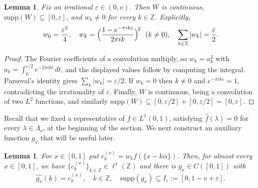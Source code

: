 \documentclass[reqno,a4paper,12pt]{amsart}
\numberwithin{equation}{section}
\newtheorem{lemma}[definition]{Lemma}
\def\Z{{\mathbb Z}}
\newcommand{\supp}{{\mathrm{supp}}}
\newcommand\1{\mathds{1}}
\begin{document}
\begin{lemma}\label{lem:window}
Fix an irrational $\varepsilon\in(0,v)$. Then $W$ is continuous, $\supp (W)\subseteq [0,\varepsilon]$, and $w_k\neq0$ for every $k\in\Z$. Explicitly,
\[
 w_0=\frac{\varepsilon^2}4,
 \quad
 w_k=\Bigl(\frac{1-e^{-\pi i k\varepsilon}}{2\pi i k}\Bigr)^{\!2}
 \ \ (k\neq0),
 \quad
 \sum_{k\in\Z}|w_k|=\frac\varepsilon2 .
\]
\end{lemma}

\begin{proof}
The Fourier coefficients of a convolution multiply, so $w_k=a_k^2$ with
$a_k=\int_0^{\varepsilon/2}e^{-2\pi i kt}\, dt$, and
the displayed values follow by computing the integral. Parseval's
identity gives
$\sum_k|w_k|=\varepsilon/2$.  If $w_k=0$ then $k\neq0$ and $e^{-\pi i k\varepsilon}=1$, contradicting the irrationality of
$\varepsilon$.  Finally, $W$ is continuous, being a convolution of two
$L^2$ functions, and similarly $\supp (W)\subseteq [0,\varepsilon/2]+[0,\varepsilon/2]=[0,\varepsilon]$.
\end{proof}

Recall that we fixed a representative of  $f\in L^1(0,1)$, satisfying $\widehat f(\lambda)=0$ for every $\lambda\in\Lambda_v$, at the beginning of the section. We next construct an auxiliary function $g_x$ that will be useful later.

\begin{lemma}
\label{lem:broadening}
For $x\in[0,1]$ put $c^{(x)}_k=w_kf(\{x-k\alpha\})$.  Then, for almost
every $x\in[0,1]$, we have $\{c^{(x)}_k\}_{k\in\Z}\in\ell^1(\Z)$ and
there is $g_x\in C([0,1])$ with
\[
 \widehat{g_x}(k)=c^{(x)}_k, \quad  k\in\Z,
 \quad
 \supp (g_x)\subseteq I_\varepsilon:=[0,1-v+\varepsilon] .
\]
\end{lemma}
\end{document}
